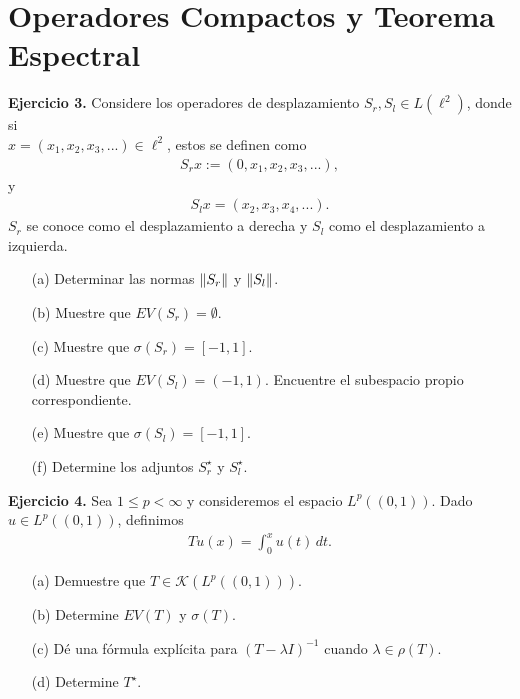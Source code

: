\section{Operadores Compactos y Teorema Espectral}

\textbf{Ejercicio 3.} Considere los operadores de desplazamiento $S_r,S_l\in L(\ell^2)$, donde si\\ $x=(x_1,x_2,x_3,...)\in \ell^2$, estos se definen como
\begin{align*}
    S_rx:=(0,x_1,x_2,x_3,...),
\end{align*}
y
\begin{align*}
    S_lx=(x_2,x_3,x_4,...).
\end{align*}
$S_r$ se conoce como el desplazamiento a derecha y $S_l$ como el desplazamiento a izquierda.

\begin{enumerate}
    \item[(a)] Determinar las normas $\left\|S_r\right\|$ y $\left\|S_l\right\|$.
    \item[(b)] Muestre que $EV(S_r)=\emptyset$.
    \item[(c)] Muestre que $\sigma(S_r)=[-1,1]$.
    \item[(d)] Muestre que $EV(S_l)=(-1,1)$. Encuentre el subespacio propio correspondiente.
    \item[(e)] Muestre que $\sigma(S_l)=[-1,1]$.
    \item[(f)] Determine los adjuntos $S_r^\star$ y $S_l^\star$.
\end{enumerate}

\textbf{Ejercicio 4.} Sea $1\leq p<\infty$ y consideremos el espacio $L^p((0,1))$. Dado $u \in L^p((0,1))$, definimos
\begin{align*}
    Tu(x)=\int_{0}^xu(t)\, dt.
\end{align*}
\begin{enumerate}
    \item[(a)] Demuestre que $T \in \mathcal{K}(L^p((0,1)))$. 
    \item[(b)] Determine $EV(T)$ y $\sigma(T)$.
    \item[(c)] Dé una fórmula explícita para $(T-\lambda I)^{-1}$ cuando $\lambda\in \rho(T)$.
    \item[(d)] Determine $T^\star$.
\end{enumerate}

